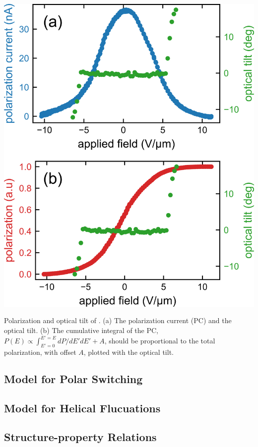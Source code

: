 \documentclass{tufte-handout}
\begin{document}
\begin{marginfigure}
    \includegraphics[width=\linewidth]{./figs/PRCvsTilt/T110.png}
    \caption{Polarization and optical tilt of . (a) The polarization
        current (PC) and the optical tilt. (b) The cumulative integral of the PC,
        $P(E) \propto \int_{E'=0}^{E'=E}dP/dE' dE'+A$, should be proportional to
        the total polarization, with offset $A$, plotted with the optical tilt.
    }
\end{marginfigure}

\subsection{Model for Polar Switching}
\subsection{Model for Helical Flucuations}
\subsection{Structure-property Relations} %
\end{document}
